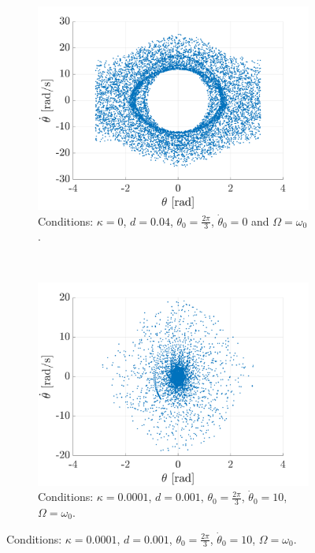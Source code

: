 \documentclass[a4paper,12pt,twoside]{article}
\begin{document}
\begin{figure}[h]
	\begin{subfigure}[t]{0.48\textwidth}
		\includegraphics[width=\textwidth]{graphs/g_funfunfun_1984.png}
		\caption{Conditions: $\kappa=0$, $d=0.04$, $\theta_0=\frac{2\pi}{3}$, $\dot{\theta}_0=0$ and $\Omega=\omega_0$.}
		\label{fig:g-funfunfun-1984}
	\end{subfigure}
	~
	\begin{subfigure}[t]{0.48\textwidth}
		\includegraphics[width=\textwidth]{graphs/g_funfunfun_comet.png}
		\caption{Conditions: $\kappa=0.0001$, $d=0.001$, $\theta_0=\frac{2\pi}{3}$, $\dot{\theta}_0=10$, $\Omega=\omega_0$.}
		\label{fig:g-funfunfun-comet}
	\end{subfigure}

\end{figure}
\end{document}
